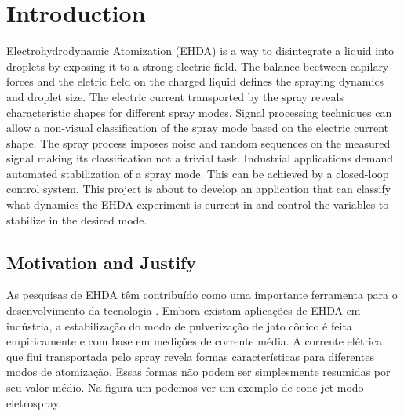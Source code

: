\chapter{Introduction}
\label{chap:intro} %

Electrohydrodynamic Atomization (EHDA) is a way to disintegrate a liquid into droplets by exposing it to a strong electric field.\cite{prunet}
The balance beetween capilary forces and the eletric field on the charged liquid defines the spraying dynamics and droplet size.
The electric current transported by the spray reveals characteristic shapes for different spray modes.
Signal processing techniques can allow a non-visual classification of the spray mode based on the electric current shape.\cite{Sjaaks}
The spray process imposes noise and random sequences on the measured signal making its classification not a trivial task. 
Industrial applications demand automated stabilization of a spray mode. 
This can be achieved by a closed-loop control system. 
This project is about to develop an application that can classify what dynamics the EHDA experiment is current in and control the variables to stabilize in the desired mode. 

\section{Motivation and Justify}
\label{sec:motivacao}

As pesquisas de EHDA têm contribuído como uma importante ferramenta para
o desenvolvimento da tecnologia . Embora existam aplicações de EHDA em
indústria, a estabilização do modo de pulverização de jato cônico é feita empiricamente e com base em medições de corrente média.
A corrente elétrica que flui transportada pelo spray revela formas características para diferentes modos de atomização.
Essas formas não podem ser simplesmente resumidas por seu valor médio. Na figura um podemos ver um exemplo de cone-jet
modo eletrospray.

